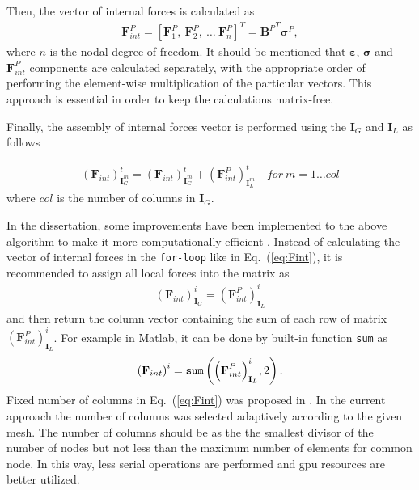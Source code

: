 \documentclass[11pt,a4paper,final]{report}
\theoremstyle{plain}
\begin{document}
Then, the vector of internal forces is calculated as
\begin{eqnarray}
	\label{eq:forces}
	\textbf{F}^P_{int}=\left[\textbf{F}^P_1,\ \textbf{F}^P_2,\ \ldots\ \textbf{F}^P_{n} \right]^T={\textbf{B}^P}^T\boldsymbol{\sigma}^P,
\end{eqnarray}
where $n$ is the nodal degree of freedom.
It should be mentioned that \(\boldsymbol{\varepsilon}\), \(\boldsymbol{\sigma}\) and \(\textbf{F}^P_{int}\) components are calculated separately, with the appropriate order of performing the element-wise multiplication of the particular vectors.
This approach is essential in order to keep the calculations matrix-free.

Finally, the assembly of internal forces vector is performed using the \(\textbf{I}_G\) and \(\textbf{I}_L\) as follows

\begin{eqnarray}
	\label{eq:Fint}
	{\left(\textbf{F}_{int}\right)}^t_{\textbf{I}^m_G} = {\left(\textbf{F}_{int}\right)}^t_{\textbf{I}^m_G} + {\left(\textbf{F}^P_{int}\right)}^t_{\textbf{I}^m_L}\quad for\ m=1\ldots col 
\end{eqnarray}
where \(col\) is the number of columns in \(\textbf{I}_G\).

In the dissertation, some improvements have been implemented to the above algorithm to make it more computationally efficient \cite{fiborek2022spectral}.
Instead of calculating the vector of internal forces in the \verb+for-loop+ like in Eq.~(\ref{eq:Fint}), it is recommended to assign all local forces into the matrix as
\begin{eqnarray}
	\label{eq:Fmatrix}
	{\left(\textbf{F}_{int}\right)}^i_{\textbf{I}_G} ={\left(\textbf{F}^P_{int}\right)}^i_{\textbf{I}_L}
\end{eqnarray}
and then return the column vector containing the sum of each row of matrix \({\left(\textbf{F}^P_{int}\right)}^i_{\textbf{I}_L}\).
For example in Matlab, it can be done by built-in function \verb|sum| as
\begin{eqnarray}
	\label{eq:Fsum}
	{\left(\textbf{F}_{int}\right)}^i = \verb|sum| \left({\left(\textbf{F}^P_{int}\right)}^i_{\textbf{I}_L},2\right).
\end{eqnarray}
Fixed number of columns in Eq.~(\ref{eq:Fint}) was proposed in \cite{kudela2016parallel}.
In the current approach the number of columns was selected adaptively according to the given mesh.
The number of columns should be as the the smallest divisor of the number of nodes but not less than the maximum number of elements for common node.
In this way, less serial operations are performed and \ac{gpu} resources are better utilized.
\end{document}
